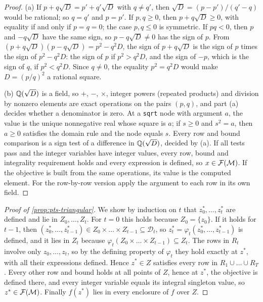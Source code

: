 \begin{proof}
(a) If $p+q\sqrt D=p'+q'\sqrt D$ with $q\ne q'$, then $\sqrt D=(p-p')/(q'-q)$ would be rational; so $q=q'$ and $p=p'$.
If $p,q\ge0$, then $p+q\sqrt D\ge0$, with equality if and only if $p=q=0$; the case $p,q\le0$ is symmetric.
If $pq<0$, then $p$ and $-q\sqrt D$ have the same sign, so $p-q\sqrt D\neq0$ has the sign of $p$.
From $(p+q\sqrt D)(p-q\sqrt D)=p^2-q^2D$, the sign of $p+q\sqrt D$ is the sign of $p$ times the sign of $p^2-q^2D$: the sign of $p$ if $p^2>q^2D$, and the sign of $-p$, which is the sign of $q$, if $p^2<q^2D$.
Since $q\ne0$, the equality $p^2=q^2D$ would make $D=(p/q)^2$ a rational square.

(b) $\mathbb{Q}(\sqrt D)$ is a field, so $+$, $-$, $\times$, integer powers (repeated products) and division by nonzero elements are exact operations on the pairs $(p,q)$, and part (a) decides whether a denominator is zero.
At a \texttt{sqrt} node with argument $a$, the value is the unique nonnegative real whose square is $a$; if $s\ge0$ and $s^2=a$, then $a\ge0$ satisfies the domain rule and the node equals $s$.
Every row and bound comparison is a sign test of a difference in $\mathbb{Q}(\sqrt D)$, decided by (a).
If all tests pass and the integer variables have integer values, every row, bound and integrality requirement holds and every expression is defined, so $x\in\mathcal{F}(\mathcal{M})$.
If the objective is built from the same operations, its value is the computed element.
For the row-by-row version apply the argument to each row in its own field.
\end{proof}

\begin{proof}[Proof of \cref{prop:pts-triangular}]
We show by induction on $t$ that $z^*_0,\dots,z^*_t$ are defined and lie in $Z_0,\dots,Z_t$.
For $t=0$ this holds because $Z_0=\{z_0\}$.
If it holds for $t-1$, then $(z^*_0,\dots,z^*_{t-1})\in Z_0\times\dots\times Z_{t-1}\subseteq\mathcal{D}_t$, so $z^*_t=\varphi_t(z^*_0,\dots,z^*_{t-1})$ is defined, and it lies in $Z_t$ because $\varphi_t(Z_0\times\dots\times Z_{t-1})\subseteq Z_t$.
The rows in $R_t$ involve only $z_0,\dots,z_t$, so by the defining property of $\varphi_t$ they hold exactly at $z^*$, with all their expressions defined.
Hence $z^*\in Z$ satisfies every row in $R_1\cup\dots\cup R_T$.
Every other row and bound holds at all points of $Z$, hence at $z^*$, the objective is defined there, and every integer variable equals its integral singleton value, so $z^*\in\mathcal{F}(\mathcal{M})$.
Finally $f(z^*)$ lies in every enclosure of $f$ over $Z$.
\end{proof}

